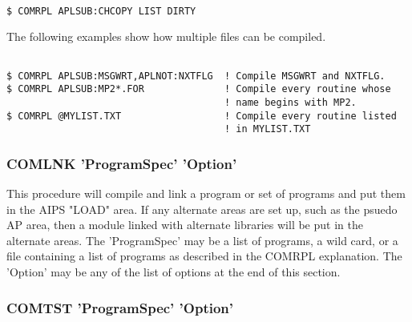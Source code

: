 \begin{verbatim}

$ COMRPL APLSUB:CHCOPY LIST DIRTY

\end{verbatim}

The following examples show how multiple files can be compiled.

\begin{verbatim}

$ COMRPL APLSUB:MSGWRT,APLNOT:NXTFLG  ! Compile MSGWRT and NXTFLG.
$ COMRPL APLSUB:MP2*.FOR              ! Compile every routine whose
                                      ! name begins with MP2.
$ COMRPL @MYLIST.TXT                  ! Compile every routine listed
                                      ! in MYLIST.TXT
\end{verbatim}

\subsubsection{ COMLNK 'ProgramSpec' 'Option' }

This procedure will compile and link a program or set of programs
and put them in the AIPS
"LOAD" area.  If any alternate areas are set up,
such as the psuedo AP area, then a module linked with alternate libraries
will be put in the alternate areas.  The 'ProgramSpec' may be a list
of programs, a wild card,
or a file containing a list of programs as described in the COMRPL
explanation.  The 'Option' may be any of the list of options at the end
of this section.

\subsubsection{ COMTST 'ProgramSpec' 'Option' }

